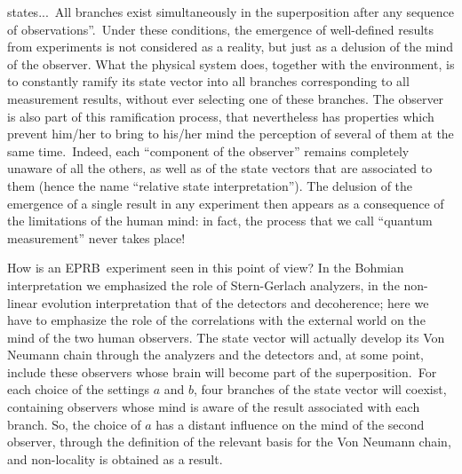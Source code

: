 \documentclass[12pt,onecolumn]{article}%
\begin{document}
states...\ All branches exist simultaneously in the superposition after any
sequence of observations''.\ Under these conditions, the emergence of
well-defined results from experiments is not considered as a reality, but just
as a delusion of the mind of the observer. What the physical system does,
together with the environment, is to constantly ramify its state vector into
all branches corresponding to all measurement results, without ever selecting
one of these branches. The observer is also part of this ramification process,
that nevertheless has properties which prevent him/her to bring to his/her
mind the perception of several of them at the same time.\ Indeed, each
``component of the observer'' remains completely unaware of all the others, as
well as of the state vectors that are associated to them (hence the name
``relative state interpretation''). The delusion of the emergence of a single
result in any experiment then appears as a consequence of the limitations of
the human mind: in fact, the process that we call ``quantum measurement''
never takes place!

How is an EPRB\ experiment seen in this point of view? In the Bohmian
interpretation we emphasized the role of Stern-Gerlach analyzers, in the
non-linear evolution interpretation that of the detectors and decoherence;
here we have to emphasize the role of the correlations with the external world
on the mind of the two human observers. The state vector will actually develop
its Von Neumann chain through the analyzers and the detectors and, at some
point, include these observers whose brain will become part of the
superposition.\ For each choice of the settings $a$ and $b$, four branches of
the state vector will coexist, containing observers whose mind is aware of the
result associated with each branch. So, the choice of $a$ has a distant
influence on the mind of the second observer, through the definition of the
relevant basis for the Von Neumann chain, and non-locality is obtained as a result.
\end{document}
